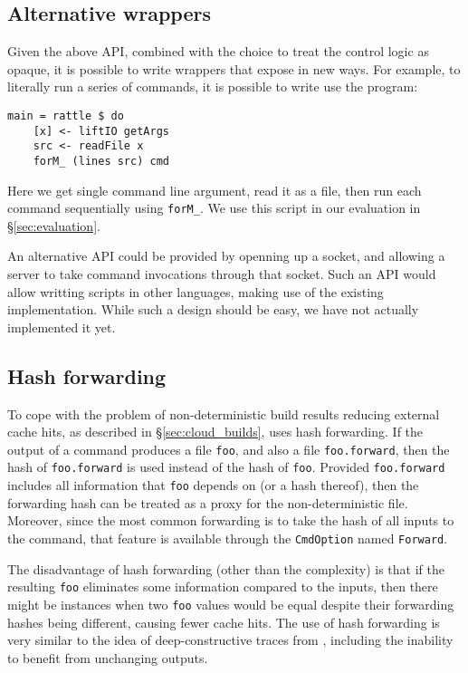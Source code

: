 \subsection{Alternative \Rattle wrappers}

Given the above API, combined with the choice to treat the control logic as opaque, it is possible to write wrappers that expose \Rattle in new ways. For example, to literally run a series of commands, it is possible to write use the \Rattle program:

\vspace{3mm}
\begin{verbatim}
main = rattle $ do
    [x] <- liftIO getArgs
    src <- readFile x
    forM_ (lines src) cmd
\end{verbatim}
\vspace{3mm}

Here we get single command line argument, read it as a file, then run each command sequentially using \texttt{forM\_}. We use this script in our evaluation in \S\ref{sec:evaluation}.

An alternative API could be provided by openning up a socket, and allowing a \Rattle server to take command invocations through that socket. Such an API would allow writting \Rattle scripts in other languages, making use of the existing \Rattle implementation. While such a design should be easy, we have not actually implemented it yet.

\subsection{Hash forwarding}
\label{sec:forward_hashes}

To cope with the problem of non-deterministic build results reducing external cache hits, as described in \S\ref{sec:cloud_builds}, \Rattle uses hash forwarding. If the output of a command produces a file \texttt{foo}, and also a file \texttt{foo.forward}, then the hash of \texttt{foo.forward} is used instead of the hash of \texttt{foo}. Provided \texttt{foo.forward} includes all information that \texttt{foo} depends on (or a hash thereof), then the forwarding hash can be treated as a proxy for the non-deterministic file. Moreover, since the most common forwarding is to take the hash of all inputs to the command, that feature is available through the \texttt{CmdOption} named \texttt{Forward}.

The disadvantage of hash forwarding (other than the complexity) is that if the resulting \texttt{foo} eliminates some information compared to the inputs, then there might be instances when two \texttt{foo} values would be equal despite their forwarding hashes being different, causing fewer cache hits. The use of hash forwarding is very similar to the idea of deep-constructive traces from \citet[\S4.2.4]{build_systems_a_la_carte}, including the inability to benefit from unchanging outputs.

